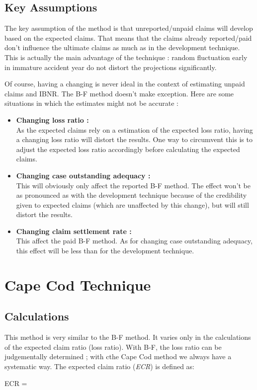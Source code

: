 \documentclass[11pt, english]{memoir}
\numberwithin{definition}{section}
\begin{document}
\section{Key Assumptions}
The key assumption of the method is that unreported/unpaid claims will develop based on the expected claims. That means that the claims already reported/paid don't influence the ultimate claims as much as in the development technique. This is actually the main advantage of the technique : random fluctuation early in immature accident year do not distort the projections significantly. 

Of course, having a changing is never ideal in the context of estimating unpaid claims and IBNR. The B-F method doesn't make exception. Here are some situations in which the estimates might not be accurate : 
\begin{itemize}
	\item \textbf{Changing loss ratio :}\\
	As the expected claims rely on a estimation of the expected loss ratio, having a changing loss ratio will distort the results. One way to circumvent this is to adjust the expected loss ratio accordingly before calculating the expected claims. \\
	\item \textbf{Changing case outstanding adequacy :}\\
	This will obviously only affect the reported B-F method. The effect won't be as pronounced as with the development technique because of the credibility given to expected claims (which are unaffected by this change), but will still distort the results. \\
	\item \textbf{Changing claim settlement rate :}\\
	This affect the paid B-F method. As for changing case outstanding adequacy, this effect will be less than for the development technique. 
\end{itemize}











\chapter{Cape Cod Technique}

\section{Calculations}
This method is very similar to the B-F method. It varies only in the calculations of the expected claim ratio (loss ratio). With B-F, the loss ratio can be judgementally determined ; with cthe Cape Cod method we always have a systematic way. The expected claim ratio (\emph{ECR}) is defined as:
\begin{tcolorbox}
ECR = 
\end{tcolorbox} 
\end{document}
